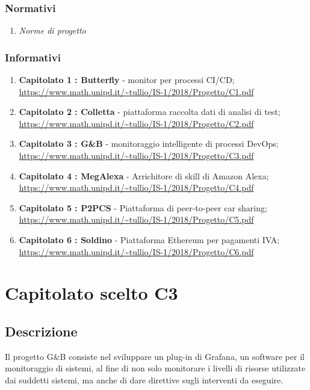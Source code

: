         \subsubsection{Normativi}
            \begin{enumerate}
                \item \textit{Norme di progetto}
            \end{enumerate}
         \subsubsection{Informativi}
            \begin{enumerate}
                \item \textbf{Capitolato 1 : Butterfly} - monitor per processi CI/CD; \newline 	\url{ https://www.math.unipd.it/~tullio/IS-1/2018/Progetto/C1.pdf}
			    \item \textbf{Capitolato 2 : Colletta} - piattaforma raccolta dati di analisi di test; \newline   \url{https://www.math.unipd.it/~tullio/IS-1/2018/Progetto/C2.pdf}
                \item \textbf{Capitolato 3 : G\&B} - monitoraggio intelligente di processi DevOps; \newline \url{https://www.math.unipd.it/~tullio/IS-1/2018/Progetto/C3.pdf}
                \item \textbf{Capitolato 4 : MegAlexa} - Arrichitore di skill di Amazon Alexa; \newline \url{https://www.math.unipd.it/~tullio/IS-1/2018/Progetto/C4.pdf}
                \item \textbf{Capitolato 5 : P2PCS} - Piattaforma di peer-to-peer car sharing; \newline  \url{https://www.math.unipd.it/~tullio/IS-1/2018/Progetto/C5.pdf}
                \item \textbf{Capitolato 6 : Soldino} - Piattaforma Ethereum per pagamenti IVA; \newline \url{https://www.math.unipd.it/~tullio/IS-1/2018/Progetto/C6.pdf}
            \end{enumerate}




			
\newpage
    \section{Capitolato scelto C3}
        \subsection{Descrizione}
            Il progetto G\&B consiste nel sviluppare un plug-in di Grafana, un software per il monitoraggio di sistemi, al fine di non solo monitorare i livelli di risorse utilizzate dai suddetti sistemi, ma anche di dare direttive sugli interventi da eseguire.
